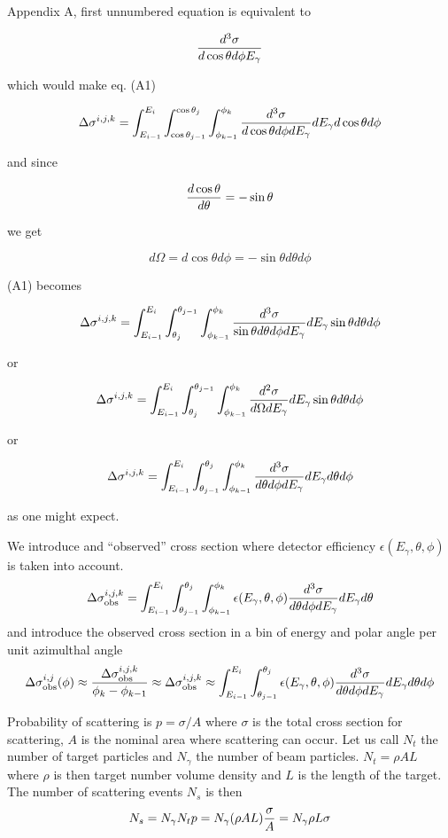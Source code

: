 \documentclass{article}
\begin{document}
Appendix A, first unnumbered equation is equivalent to 

$${d^3\sigma \over d\cos\theta d\phi E_\gamma}$$

which would make eq. (A1)

$$\Delta\sigma^{i,j,k} = \int^{E_i}_{E_{i-1}}\int^{\cos\theta_j}_{\cos\theta_{j-1}}\int^{\phi_k}_{\phi_{k-1}} {d^3\sigma \over d\cos\theta d\phi dE_\gamma}dE_\gamma d\cos\theta d\phi$$

and since

$${d\cos\theta \over d\theta} = -\sin\theta$$

we get

$$ d\Omega = d\cos\theta d\phi = -\sin\theta d\theta d\phi $$

(A1) becomes

$$\Delta\sigma^{i,j,k} = \int^{E_i}_{E_{i-1}}\int_{\theta_j}^{\theta_{j-1}}\int^{\phi_k}_{\phi_{k-1}} {d^3\sigma \over \sin\theta d\theta d\phi dE_\gamma} dE_\gamma \sin\theta d\theta d\phi$$

or

$$\Delta\sigma^{i,j,k} = \int^{E_i}_{E_{i-1}}\int_{\theta_j}^{\theta_{j-1}}\int^{\phi_k}_{\phi_{k-1}} {d^2\sigma \over d\Omega dE_\gamma} dE_\gamma \sin\theta d\theta d\phi$$

or

$$\Delta\sigma^{i,j,k} = \int^{E_i}_{E_{i-1}}\int_{\theta_{j-1}}^{\theta_j}\int^{\phi_k}_{\phi_{k-1}} {d^3\sigma \over d\theta d\phi dE_\gamma} dE_\gamma d\theta d\phi$$

as one might expect.

We introduce and ``observed'' cross section where detector efficiency $\epsilon(E_\gamma,\theta,\phi)$ is taken into account.
$$
\Delta\sigma^{i,j,k}_{\rm obs} = \int^{E_i}_{E_{i-1}}\int_{\theta_{j-1}}^{\theta_j}\int^{\phi_k}_{\phi_{k-1}} \epsilon(E_\gamma,\theta,\phi) {d^3\sigma \over d\theta d\phi dE_\gamma} dE_\gamma d\theta
$$
and introduce the observed cross section in a bin of energy and polar angle per unit azimulthal angle
$$
\Delta\sigma^{i,j}_{\rm obs}(\phi) \approx {\Delta\sigma^{i,j,k}_{\rm obs} \over \phi_k - \phi_{k-1}} \approx \Delta\sigma^{i,j,k}_{\rm obs} \approx \int^{E_i}_{E_{i-1}}\int_{\theta_{j-1}}^{\theta_j} \epsilon(E_\gamma,\theta,\phi) {d^3\sigma \over d\theta d\phi dE_\gamma} dE_\gamma d\theta d\phi
$$

Probability of scattering is $p = \sigma/A$ where $\sigma$ is the total cross section for scattering, $A$ is the nominal area where scattering can occur. Let us call $N_t$ the number of target particles and $N_\gamma$ the number of beam particles. $N_t = \rho AL$ where $\rho$ is then target number volume density and $L$ is the length of the target. The number of scattering events $N_s$ is then
$$
N_s = N_\gamma N_t p = N_\gamma(\rho A L){\sigma\over A} = N_\gamma\rho L\sigma
$$
\end{document}
